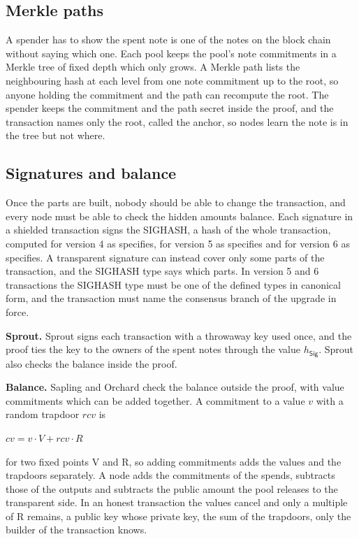 \documentclass{article}
\let\oldcite\cite
\renewcommand{\cite}[2][]{\raisebox{0ex}{\oldcite[{#1}]{#2}}}
\newcommand{\lsubsection}[2]{\def\sectionlabel{#2} \subsection{#1}\label{#2}}
\theoremstyle{labelledtheorem} %
\begin{document}
\lsubsection{Merkle paths}{readablemerkle}

A spender has to show the spent note is one of the notes on the block chain without saying which one. Each pool keeps the pool's note commitments in a Merkle tree of fixed depth which only grows. A Merkle path lists the neighbouring hash at each level from one note commitment up to the root, so anyone holding the commitment and the path can recompute the root. The spender keeps the commitment and the path secret inside the proof, and the transaction names only the root, called the anchor, so nodes learn the note is in the tree but not where.

\lsubsection{Signatures and balance}{readablesigbalance}
\label{orchardbalance}\label{saplingbalance}\label{sighash}\label{spendauthsig}\label{sproutnonmalleability}%

Once the parts are built, nobody should be able to change the transaction, and every node must be able to check the hidden amounts balance. Each signature in a shielded transaction signs the SIGHASH, a hash of the whole transaction, computed for version 4 as \cite{ZIP-243} specifies, for version 5 as \cite{ZIP-244} specifies and for version 6 as \cite{ZIP-229} specifies. A transparent signature can instead cover only some parts of the transaction, and the SIGHASH type says which parts. In version 5 and 6 transactions the SIGHASH type must be one of the defined types in canonical form, and the transaction must name the consensus branch of the upgrade in force.

\textbf{Sprout.} Sprout signs each transaction with a throwaway key used once, and the proof ties the key to the owners of the spent notes through the value $h_{\mathsf{Sig}}$. Sprout also checks the balance inside the proof.

\textbf{Balance.} Sapling and Orchard check the balance outside the proof, with value commitments which can be added together. A commitment to a value $v$ with a random trapdoor $\mathit{rcv}$ is

\begin{center}$\mathit{cv} = v \cdot V + \mathit{rcv} \cdot R$\end{center}

for two fixed points V and R, so adding commitments adds the values and the trapdoors separately. A node adds the commitments of the spends, subtracts those of the outputs and subtracts the public amount the pool releases to the transparent side. In an honest transaction the values cancel and only a multiple of R remains, a public key whose private key, the sum of the trapdoors, only the builder of the transaction knows.
\end{document}
